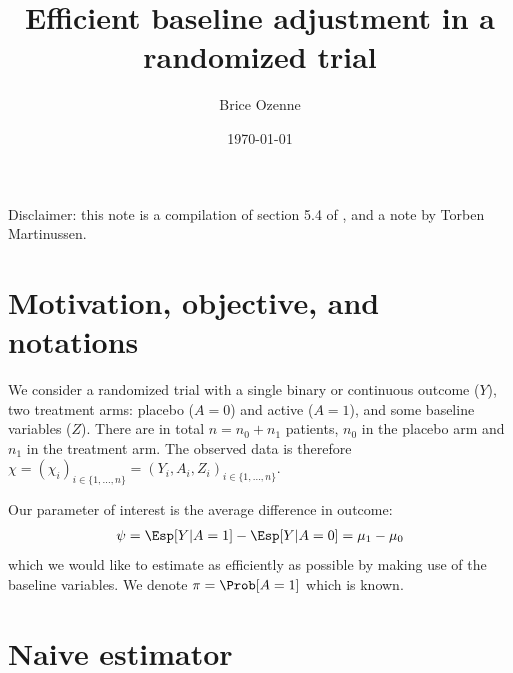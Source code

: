\documentclass[12pt]{article}
\author{Brice Ozenne}
\date{\today}
\title{Efficient baseline adjustment in a randomized trial}
\newcommand\sample{\chi}
\begin{document}
\maketitle
Disclaimer: this note is a compilation of section 5.4 of
\cite{tsiatis2007semiparametric}, \cite{zhang2010increasing} and a note by
Torben Martinussen.

\section{Motivation, objective, and notations}
\label{sec:orgcdf2321}

We consider a randomized trial with a single binary or continuous
outcome (\(Y\)), two treatment arms: placebo (\(A=0\)) and active
(\(A=1\)), and some baseline variables (\(Z\)). There are in total
\(n=n_0+n_1\) patients, \(n_0\) in the placebo arm and \(n_1\) in the
treatment arm. The observed data is therefore \(\sample =
\left(\sample_i\right)_{i \in \{1,\ldots,n\}} =
\left(Y_i,A_i,Z_i\right)_{i \in \{1,\ldots,n\}}\).

\bigskip 

Our parameter of interest is the average difference in outcome:
\begin{align*}
\psi = \Esp[Y|A=1] - \Esp[Y|A=0] = \mu_1 - \mu_0
\end{align*}
which we would like to estimate as efficiently as possible by making
use of the baseline variables. We denote \(\pi=\Prob[A=1]\) which is
known.

\section{Naive estimator}
\label{sec:orgd815e35}
\end{document}
